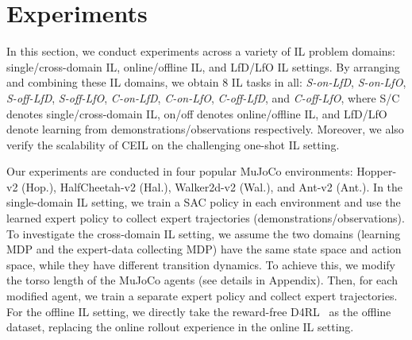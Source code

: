 

\section{Experiments}

In this section, we conduct experiments across a variety of IL problem domains: single/cross-domain IL, online/offline IL, and LfD/LfO IL settings. 
By arranging and combining these IL domains, we obtain 8 IL tasks in all: \textit{S-on-LfD}, \textit{S-on-LfO}, \textit{S-off-LfD}, \textit{S-off-LfO}, \textit{C-on-LfD}, \textit{C-on-LfO}, \textit{C-off-LfD}, and \textit{C-off-LfO}, where S/C denotes single/cross-domain IL, on/off denotes online/offline IL, and LfD/LfO denote learning from demonstrations/observations respectively. Moreover, we also verify the scalability of CEIL on the challenging one-shot IL setting. 


Our experiments are conducted in four popular MuJoCo environments: Hopper-v2 (Hop.), HalfCheetah-v2 (Hal.), Walker2d-v2 (Wal.), and Ant-v2 (Ant.). 
In the single-domain IL setting, we train a SAC policy in each environment and use the learned expert policy to collect expert trajectories (demonstrations/observations). 
To investigate the cross-domain IL setting, we assume the two domains (learning MDP and the expert-data collecting MDP) have the same state space and action space, while they have different transition dynamics. To achieve this, we modify the torso length of the MuJoCo agents (see details in Appendix). Then, for each modified agent, we train a separate expert policy and collect expert trajectories. 
For the offline IL setting, we directly take the reward-free D4RL~\citep{fu2020d4rl} as the offline dataset, replacing the online rollout experience in the online IL setting. 



